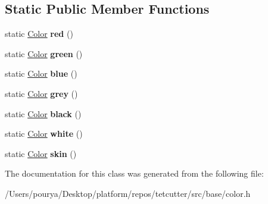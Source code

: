 \subsection*{Static Public Member Functions}
\begin{DoxyCompactItemize}
\item 
\hypertarget{classps_1_1base_1_1Color_a287cd9aef06e5c646a26289fd5068618}{}static \hyperlink{classps_1_1base_1_1Color}{Color} {\bfseries red} ()\label{classps_1_1base_1_1Color_a287cd9aef06e5c646a26289fd5068618}

\item 
\hypertarget{classps_1_1base_1_1Color_ac63bc71202fa47a3e89ee134d59a57a4}{}static \hyperlink{classps_1_1base_1_1Color}{Color} {\bfseries green} ()\label{classps_1_1base_1_1Color_ac63bc71202fa47a3e89ee134d59a57a4}

\item 
\hypertarget{classps_1_1base_1_1Color_aed2c3beb80d754b1fcc4e28c055211e3}{}static \hyperlink{classps_1_1base_1_1Color}{Color} {\bfseries blue} ()\label{classps_1_1base_1_1Color_aed2c3beb80d754b1fcc4e28c055211e3}

\item 
\hypertarget{classps_1_1base_1_1Color_a1e717154ee5b533cc90ae46ee14f1785}{}static \hyperlink{classps_1_1base_1_1Color}{Color} {\bfseries grey} ()\label{classps_1_1base_1_1Color_a1e717154ee5b533cc90ae46ee14f1785}

\item 
\hypertarget{classps_1_1base_1_1Color_acddd38ad59d047f80e05d2365a7e337e}{}static \hyperlink{classps_1_1base_1_1Color}{Color} {\bfseries black} ()\label{classps_1_1base_1_1Color_acddd38ad59d047f80e05d2365a7e337e}

\item 
\hypertarget{classps_1_1base_1_1Color_ac8f8192798f2febae0c35a9c46c27af1}{}static \hyperlink{classps_1_1base_1_1Color}{Color} {\bfseries white} ()\label{classps_1_1base_1_1Color_ac8f8192798f2febae0c35a9c46c27af1}

\item 
\hypertarget{classps_1_1base_1_1Color_ad2556571f9ba2125e01948235f06e0dc}{}static \hyperlink{classps_1_1base_1_1Color}{Color} {\bfseries skin} ()\label{classps_1_1base_1_1Color_ad2556571f9ba2125e01948235f06e0dc}

\end{DoxyCompactItemize}


The documentation for this class was generated from the following file\+:\begin{DoxyCompactItemize}
\item 
/\+Users/pourya/\+Desktop/platform/repos/tetcutter/src/base/color.\+h\end{DoxyCompactItemize}
